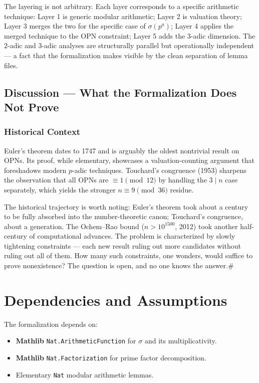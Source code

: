 \documentclass[11pt,a4paper]{article}
\begin{document}
The layering is not arbitrary. Each layer corresponds to a specific arithmetic technique: Layer 1 is generic modular arithmetic; Layer 2 is valuation theory; Layer 3 merges the two for the specific case of $\sigma(p^a)$; Layer 4 applies the merged technique to the OPN constraint; Layer 5 adds the $3$-adic dimension. The $2$-adic and $3$-adic analyses are structurally parallel but operationally independent --- a fact that the formalization makes visible by the clean separation of lemma files.

\subsection{Discussion --- What the Formalization Does Not Prove}

\subsubsection{Historical Context}

Euler's theorem dates to 1747 and is arguably the oldest nontrivial result on OPNs. Its proof, while elementary, showcases a valuation-counting argument that foreshadows modern $p$-adic techniques. Touchard's congruence (1953) sharpens the observation that all OPNs are $\equiv 1 \pmod{12}$ by handling the $3 \mid n$ case separately, which yields the stronger $n \equiv 9 \pmod{36}$ residue.

The historical trajectory is worth noting: Euler's theorem took about a century to be fully absorbed into the number-theoretic canon; Touchard's congruence, about a generation. The Ochem--Rao bound ($n > 10^{1500}$, 2012) took another half-century of computational advances. The problem is characterized by slowly tightening constraints --- each new result ruling out more candidates without ruling out all of them. How many such constraints, one wonders, would suffice to prove nonexistence? The question is open, and no one knows the answer.\#

\section{Dependencies and Assumptions}

The formalization depends on:

\begin{itemize}
    \item \textbf{Mathlib} \texttt{Nat.ArithmeticFunction} for $\sigma$ and its multiplicativity.
    \item \textbf{Mathlib} \texttt{Nat.Factorization} for prime factor decomposition.
    \item Elementary \texttt{Nat} modular arithmetic lemmas.
\end{itemize}
\end{document}
